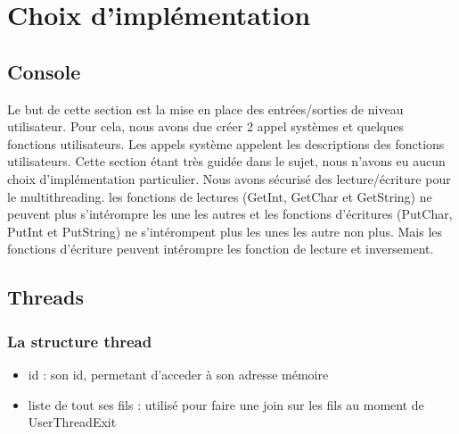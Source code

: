 \documentclass{article}
\begin{document}
\section{Choix d'implémentation}
	\subsection{Console}
	    {Le but de cette section est la mise en place des entrées/sorties de niveau utilisateur. Pour cela, nous avons due créer 2 appel systèmes et quelques fonctions utilisateurs. Les appels système appelent les descriptions des fonctions utilisateurs. Cette section étant très guidée dans le sujet, nous n'avons eu aucun choix d'implémentation particulier.
	    Nous avons sécurisé des lecture/écriture pour le multithreading. les fonctions de lectures (GetInt, GetChar et GetString) ne peuvent plus s'intérompre les une les autres et les fonctions d'écritures (PutChar, PutInt et PutString) ne s'intérompent plus les unes les autre non plus. Mais les fonctions d'écriture peuvent intérompre les fonction de lecture et inversement.}

	\subsection{Threads}
		\subsubsection{La structure thread}
			\begin{itemize}
				\item id : son id, permetant d'acceder à son adresse mémoire
				\item liste de tout ses fils : utilisé pour faire une join sur les fils au moment de UserThreadExit
			\end{itemize}
\end{document}
